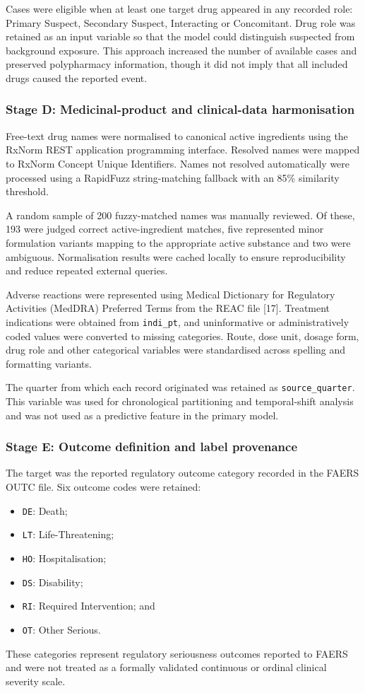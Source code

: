 \documentclass[10pt]{article}
\begin{document}
Cases were eligible when at least one target drug appeared in any recorded role: Primary Suspect, Secondary Suspect, Interacting or Concomitant. Drug role was retained as an input variable so that the model could distinguish suspected from background exposure. This approach increased the number of available cases and preserved polypharmacy information, though it did not imply that all included drugs caused the reported event.

\subsubsection{Stage D: Medicinal-product and clinical-data harmonisation}
Free-text drug names were normalised to canonical active ingredients using the RxNorm REST application programming interface. Resolved names were mapped to RxNorm Concept Unique Identifiers. Names not resolved automatically were processed using a RapidFuzz string-matching fallback with an 85\% similarity threshold.

A random sample of 200 fuzzy-matched names was manually reviewed. Of these, 193 were judged correct active-ingredient matches, five represented minor formulation variants mapping to the appropriate active substance and two were ambiguous. Normalisation results were cached locally to ensure reproducibility and reduce repeated external queries.

Adverse reactions were represented using Medical Dictionary for Regulatory Activities (MedDRA) Preferred Terms from the REAC file [17]. Treatment indications were obtained from \texttt{indi\_pt}, and uninformative or administratively coded values were converted to missing categories. Route, dose unit, dosage form, drug role and other categorical variables were standardised across spelling and formatting variants.

The quarter from which each record originated was retained as \texttt{source\_quarter}. This variable was used for chronological partitioning and temporal-shift analysis and was not used as a predictive feature in the primary model.

\subsubsection{Stage E: Outcome definition and label provenance}
The target was the reported regulatory outcome category recorded in the FAERS OUTC file. Six outcome codes were retained:
\begin{itemize}
\item \texttt{DE}: Death;
\item \texttt{LT}: Life-Threatening;
\item \texttt{HO}: Hospitalisation;
\item \texttt{DS}: Disability;
\item \texttt{RI}: Required Intervention; and
\item \texttt{OT}: Other Serious.
\end{itemize}
These categories represent regulatory seriousness outcomes reported to FAERS and were not treated as a formally validated continuous or ordinal clinical severity scale.
\end{document}
